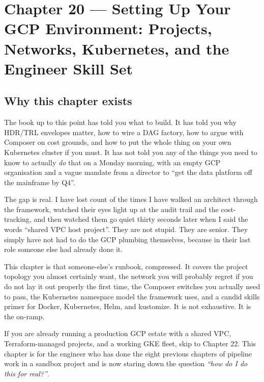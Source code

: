 \documentclass[
  11pt,
  british,
  oneside]{book}
\begin{document}
\hypertarget{chapter-20-setting-up-your-gcp-environment-projects-networks-kubernetes-and-the-engineer-skill-set}{%
\chapter{Chapter 20 --- Setting Up Your GCP Environment: Projects,
Networks, Kubernetes, and the Engineer Skill
Set}\label{chapter-20-setting-up-your-gcp-environment-projects-networks-kubernetes-and-the-engineer-skill-set}}

\hypertarget{why-this-chapter-exists}{%
\section{Why this chapter exists}\label{why-this-chapter-exists}}

The book up to this point has told you what to build. It has told you
why HDR/TRL envelopes matter, how to wire a DAG factory, how to argue
with Composer on cost grounds, and how to put the whole thing on your
own Kubernetes cluster if you must. It has not told you any of the
things you need to know to actually \emph{do} that on a Monday morning,
with an empty GCP organisation and a vague mandate from a director to
``get the data platform off the mainframe by Q4''.

The gap is real. I have lost count of the times I have walked an
architect through the framework, watched their eyes light up at the
audit trail and the cost-tracking, and then watched them go quiet thirty
seconds later when I said the words ``shared VPC host project''. They
are not stupid. They are senior. They simply have not had to do the GCP
plumbing themselves, because in their last role someone else had already
done it.

This chapter is that someone-else's runbook, compressed. It covers the
project topology you almost certainly want, the network you will
probably regret if you do not lay it out properly the first time, the
Composer switches you actually need to pass, the
Kubernetes namespace model the framework uses, and a
candid skills primer for Docker, Kubernetes, Helm, and
kustomize. It is not exhaustive. It is the on-ramp.

If you are already running a production GCP estate with a shared VPC,
Terraform-managed projects, and a working GKE fleet, skip to Chapter 22.
This chapter is for the engineer who has done the eight previous
chapters of pipeline work in a sandbox project and is now staring down
the question \emph{``how do I do this for real?''}.
\end{document}

